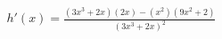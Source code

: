 \documentclass[preview]{standalone}
\begin{document}
\begin{align*}
h'(x) = \frac{(3x^3+2x)(2x)-(x^2)(9x^2+2)}{(3x^3+2x)^2}
\end{align*}
\end{document}
